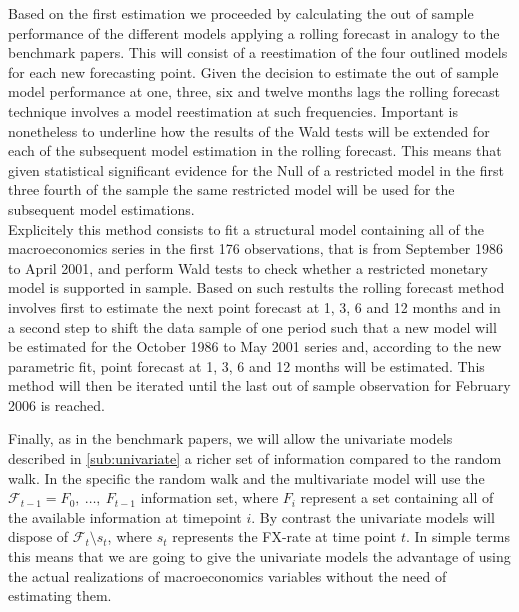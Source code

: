 Based on the first estimation we proceeded by calculating the out of sample performance of the
different models applying a rolling forecast in analogy to the benchmark papers. This will consist
of a reestimation of the four outlined models for each new forecasting point. Given the decision
to estimate the out of sample model performance at one, three, six and twelve months lags the rolling
forecast technique involves a model reestimation at such frequencies. Important is nonetheless to underline how
the results of the Wald tests will be extended for each of the subsequent model estimation
in the rolling forecast. This means that given statistical significant evidence for the Null of a
restricted model in the first three fourth of the sample the same restricted model will be used for the
subsequent model estimations. \\
Explicitely this method consists to fit a structural model containing all of the macroeconomics
series in the first 176 observations, that is from September 1986 to April 2001, and perform Wald
tests to check whether a restricted monetary model is supported in sample. Based on such restults
the rolling forecast method involves first to estimate the next point forecast at 1, 3, 6 and 12 months
and in a second step to shift the data sample of one period such that a new model will be estimated for
the October 1986 to May 2001 series and, according to the new parametric fit,
point forecast at 1, 3, 6 and 12 months will be estimated. This method will then be iterated until the last out of sample
observation for February 2006 is reached.

Finally, as in the benchmark papers, we will allow the univariate models
described in \ref{sub:univariate} a richer set of information compared to the random walk.
In the specific the random walk and the multivariate model will use the $\mathscr{F}_{t-1} = {F_0, \ \dots, \ F_{t-1}}$
information set, where $F_i$ represent a set containing all of the available information at timepoint $i$.
By contrast the univariate models will dispose of $\mathscr{F}_t \setminus s_t$, where $s_t$ represents
the FX-rate at time point $t$.
In simple terms this means that we are going to give the univariate models the advantage of using the actual realizations of
macroeconomics variables without the need of estimating them.

